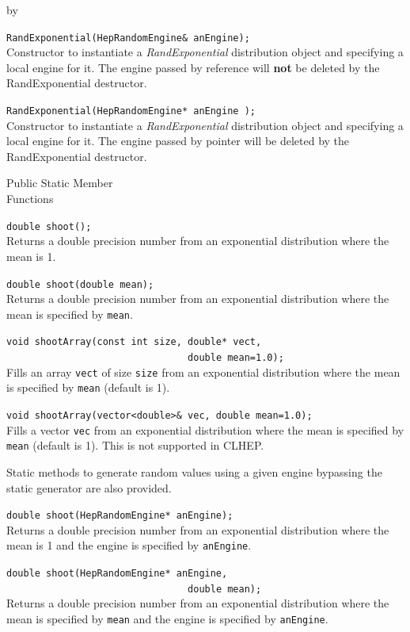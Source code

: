 \documentclass[twoside]{article}
\newcommand{\comp}[1]{\texttt{#1}}%
\newcommand{\entrylabel}[1]{\mbox{\textbf{{#1}}}\hfil}%
\newenvironment{entry}
{\begin{list}{}%
    {\renewcommand{\makelabel}{\entrylabel}%
     \setlength{\labelwidth}{90pt}%
     \setlength{\leftmargin}{\labelwidth}
     \advance\leftmargin by \labelsep%
      }%
    }%
  {\end{list}}
\newcommand{\Entrylabel}[1]%
{\raisebox{0pt}[1ex][0pt]{\makebox[\labelwidth][l]%
    {\parbox[t]{\labelwidth}{\hspace{0pt}\textbf{{#1}}}}}}
\newenvironment{Entry}%
{\renewcommand{\entrylabel}{\Entrylabel}\begin{entry}}%
  {\end{entry}}
\begin{document}
\begin{Entry}
   \verb+RandExponential(HepRandomEngine& anEngine);+\\
   Constructor to instantiate a {\em RandExponential}
   distribution object and specifying a local engine for it.
   The engine passed by reference will {\bf not} be deleted by
   the RandExponential destructor.
   
   \verb+RandExponential(HepRandomEngine* anEngine );+\\
   Constructor to instantiate a {\em RandExponential}
   distribution object and specifying a local engine for it.
   The engine passed by pointer will be deleted by the RandExponential
   destructor.

\item[Public Static Member\\ Functions]

   \verb+double shoot();+\\
   Returns a double precision number from an exponential distribution where the
   mean is 1.
  
   \verb+double shoot(double mean);+\\
   Returns a double precision number from an exponential distribution where the
   mean is specified by \comp{mean}.
  
   \verb+void shootArray(const int size, double* vect,+\\
   \verb+                                double mean=1.0);+\\
   Fills an array \comp{vect} of size \comp{size} from an exponential distribution
   where the mean is specified by \comp{mean} (default is 1).

   \verb+void shootArray(vector<double>& vec, double mean=1.0);+\\
   Fills a vector \comp{vec} from an exponential distribution
   where the mean is specified by \comp{mean} (default is 1).  This
   is not supported in CLHEP.
 
   Static methods to generate random values using a given engine
   bypassing the static generator are also provided.

   \verb+double shoot(HepRandomEngine* anEngine);+\\
   Returns a double precision number from an exponential  distribution where the
   mean is 1 and the engine is specified by \comp{anEngine}.
  
   \verb+double shoot(HepRandomEngine* anEngine,+\\
   \verb+                                double mean);+\\
   Returns a double precision number from an exponential distribution where the
   mean is specified by \comp{mean} and the engine is specified
   by \comp{anEngine}.
  

\end{Entry}
\end{document}
